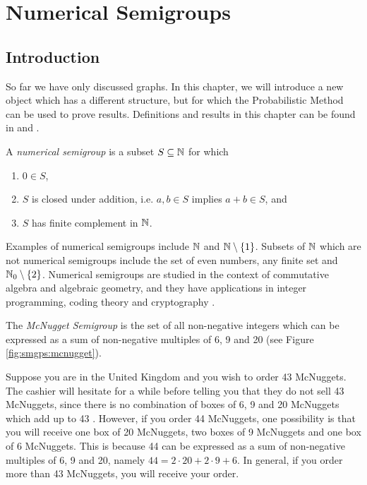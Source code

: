 \chapter{Numerical Semigroups}\label{chap:numsems}

\section{Introduction}\label{sec:smgps:intro}

So far we have only discussed graphs. In this chapter, we will introduce a new object which has a different structure, but for which the Probabilistic Method can be used to prove results. Definitions and results in this chapter can be found in \cite{rosales2009numerical} and \cite{assi2020numerical}. \par

\begin{definition} 
    A \textit{numerical semigroup} is a subset $S \subseteq \mathbb{N}$ for which 
    \begin{enumerate}
        \item $0 \in S$,
        \item $S$ is closed under addition, i.e. $a, b \in S$ implies $a + b \in S$, and
        \item $S$ has finite complement in $\mathbb{N}$.
    \end{enumerate}
\end{definition}

Examples of numerical semigroups include $\mathbb{N}$ and $\mathbb{N}\setminus \{1\}$. Subsets of $\mathbb{N}$ which are not numerical semigroups include the set of even numbers, any finite set and $\mathbb{N}_0 \setminus \{2\}$. Numerical semigroups are studied in the context of commutative algebra and algebraic geometry, and they have applications in integer programming, coding theory and cryptography \cite{assi2020numerical}. \par

\begin{example}\label{ex:smgps:mcnugget}
    The \textit{McNugget Semigroup} is the set of all non-negative integers which can be expressed as a sum of non-negative multiples of 6, 9 and 20 (see Figure \ref{fig:smgps:mcnugget}).
\end{example}

Suppose you are in the United Kingdom and you wish to order 43 McNuggets. The cashier will hesitate for a while before telling you that they do not sell 43 McNuggets, since there is no combination of boxes of 6, 9 and 20 McNuggets which add up to 43 \cite{youtube}. However, if you order 44 McNuggets, one possibility is that you will receive one box of 20 McNuggets, two boxes of 9 McNuggets and one box of 6 McNuggets. This is because 44 can be expressed as a sum of non-negative multiples of 6, 9 and 20, namely $44 = 2 \cdot 20 + 2 \cdot 9 + 6$. In general, if you order more than 43 McNuggets, you will receive your order. \par


